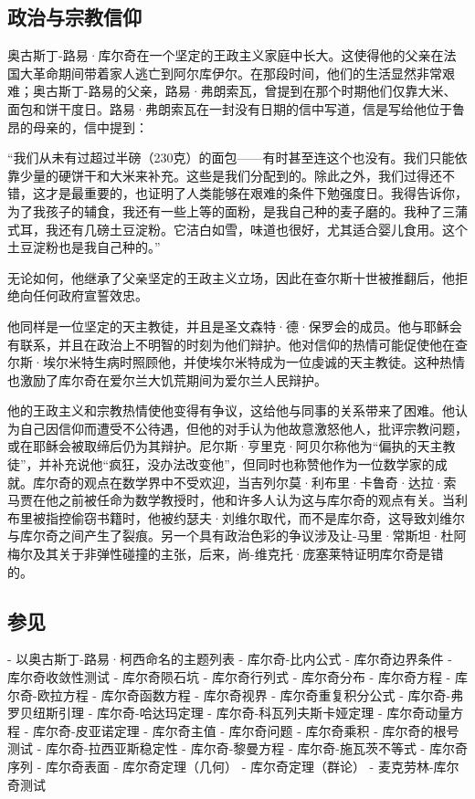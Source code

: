 \subsection{政治与宗教信仰}  
奥古斯丁-路易·库尔奇在一个坚定的王政主义家庭中长大。这使得他的父亲在法国大革命期间带着家人逃亡到阿尔库伊尔。在那段时间，他们的生活显然非常艰难；奥古斯丁-路易的父亲，路易·弗朗索瓦，曾提到在那个时期他们仅靠大米、面包和饼干度日。路易·弗朗索瓦在一封没有日期的信中写道，信是写给他位于鲁昂的母亲的，信中提到：

“我们从未有过超过半磅（230克）的面包——有时甚至连这个也没有。我们只能依靠少量的硬饼干和大米来补充。这些是我们分配到的。除此之外，我们过得还不错，这才是最重要的，也证明了人类能够在艰难的条件下勉强度日。我得告诉你，为了我孩子的辅食，我还有一些上等的面粉，是我自己种的麦子磨的。我种了三蒲式耳，我还有几磅土豆淀粉。它洁白如雪，味道也很好，尤其适合婴儿食用。这个土豆淀粉也是我自己种的。”

无论如何，他继承了父亲坚定的王政主义立场，因此在查尔斯十世被推翻后，他拒绝向任何政府宣誓效忠。

他同样是一位坚定的天主教徒，并且是圣文森特·德·保罗会的成员。他与耶稣会有联系，并且在政治上不明智的时刻为他们辩护。他对信仰的热情可能促使他在查尔斯·埃尔米特生病时照顾他，并使埃尔米特成为一位虔诚的天主教徒。这种热情也激励了库尔奇在爱尔兰大饥荒期间为爱尔兰人民辩护。

他的王政主义和宗教热情使他变得有争议，这给他与同事的关系带来了困难。他认为自己因信仰而遭受不公待遇，但他的对手认为他故意激怒他人，批评宗教问题，或在耶稣会被取缔后仍为其辩护。尼尔斯·亨里克·阿贝尔称他为“偏执的天主教徒”，并补充说他“疯狂，没办法改变他”，但同时也称赞他作为一位数学家的成就。库尔奇的观点在数学界中不受欢迎，当吉列尔莫·利布里·卡鲁奇·达拉·索马贾在他之前被任命为数学教授时，他和许多人认为这与库尔奇的观点有关。当利布里被指控偷窃书籍时，他被约瑟夫·刘维尔取代，而不是库尔奇，这导致刘维尔与库尔奇之间产生了裂痕。另一个具有政治色彩的争议涉及让-马里·常斯坦·杜阿梅尔及其关于非弹性碰撞的主张，后来，尚-维克托·庞塞莱特证明库尔奇是错的。
\subsection{参见}

- 以奥古斯丁-路易·柯西命名的主题列表
- 库尔奇-比内公式
- 库尔奇边界条件
- 库尔奇收敛性测试
- 库尔奇陨石坑
- 库尔奇行列式
- 库尔奇分布
- 库尔奇方程
- 库尔奇-欧拉方程
- 库尔奇函数方程
- 库尔奇视界
- 库尔奇重复积分公式
- 库尔奇-弗罗贝纽斯引理
- 库尔奇-哈达玛定理
- 库尔奇-科瓦列夫斯卡娅定理
- 库尔奇动量方程
- 库尔奇-皮亚诺定理
- 库尔奇主值
- 库尔奇问题
- 库尔奇乘积
- 库尔奇的根号测试
- 库尔奇-拉西亚斯稳定性
- 库尔奇-黎曼方程
- 库尔奇-施瓦茨不等式
- 库尔奇序列
- 库尔奇表面
- 库尔奇定理（几何）
- 库尔奇定理（群论）
- 麦克劳林-库尔奇测试
